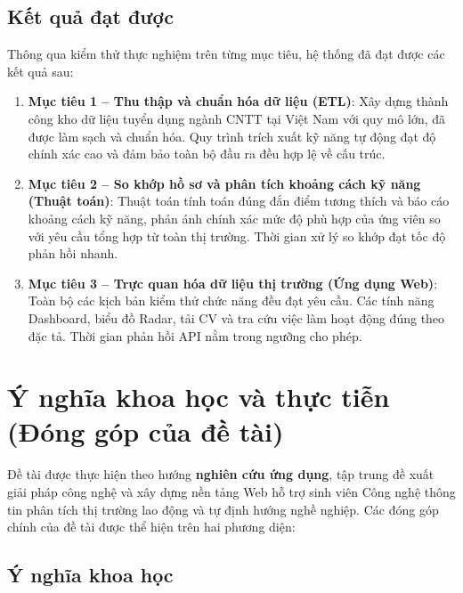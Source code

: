 \subsection{Kết quả đạt được}

Thông qua kiểm thử thực nghiệm trên từng mục tiêu, hệ thống đã đạt được các kết quả sau:

\begin{enumerate}
    \item \textbf{Mục tiêu 1 -- Thu thập và chuẩn hóa dữ liệu (ETL)}: Xây dựng thành công kho dữ liệu tuyển dụng ngành CNTT tại Việt Nam với quy mô lớn, đã được làm sạch và chuẩn hóa. Quy trình trích xuất kỹ năng tự động đạt độ chính xác cao và đảm bảo toàn bộ đầu ra đều hợp lệ về cấu trúc.

    \item \textbf{Mục tiêu 2 -- So khớp hồ sơ và phân tích khoảng cách kỹ năng (Thuật toán)}: Thuật toán tính toán đúng đắn điểm tương thích và báo cáo khoảng cách kỹ năng, phản ánh chính xác mức độ phù hợp của ứng viên so với yêu cầu tổng hợp từ toàn thị trường. Thời gian xử lý so khớp đạt tốc độ phản hồi nhanh.

    \item \textbf{Mục tiêu 3 -- Trực quan hóa dữ liệu thị trường (Ứng dụng Web)}: Toàn bộ các kịch bản kiểm thử chức năng đều đạt yêu cầu. Các tính năng Dashboard, biểu đồ Radar, tải CV và tra cứu việc làm hoạt động đúng theo đặc tả. Thời gian phản hồi API nằm trong ngưỡng cho phép.
\end{enumerate}

\section{Ý nghĩa khoa học và thực tiễn (Đóng góp của đề tài)}

Đề tài được thực hiện theo hướng \textbf{nghiên cứu ứng dụng}, tập trung đề xuất giải pháp công nghệ và xây dựng nền tảng Web hỗ trợ sinh viên Công nghệ thông tin phân tích thị trường lao động và tự định hướng nghề nghiệp. Các đóng góp chính của đề tài được thể hiện trên hai phương diện:

\subsection{Ý nghĩa khoa học}


